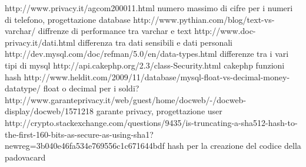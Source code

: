 http://www.privacy.it/agcom200011.html numero massimo di cifre per i numeri di telefono, progettazione database
http://www.pythian.com/blog/text-vs-varchar/ diffrenze di performance tra varchar e text
http://www.doc-privacy.it/dati.html differenza tra dati sensibili e dati personali
http://dev.mysql.com/doc/refman/5.0/en/data-types.html differenze tra i vari tipi di mysql
http://api.cakephp.org/2.3/class-Security.html cakephp funzioni hash
http://www.heldit.com/2009/11/database/mysql-float-vs-decimal-money-datatype/ float o decimal per i soldi?
http://www.garanteprivacy.it/web/guest/home/docweb/-/docweb-display/docweb/1571218 garante privacy, progettazione user
http://crypto.stackexchange.com/questions/9435/is-truncating-a-sha512-hash-to-the-first-160-bits-as-secure-as-using-sha1?newreg=3b040e46fa534e769556c1c671644bdf hash per la creazione del codice della padovacard